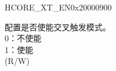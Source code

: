 \begin{register}{H}{CORE\_XT\_EN}{0x20000900}\label{regdesc:CTI_EN}
%
%
\regnewline%
\begin{regdesc}\begin{reglist}
\label{fielddesc:XT_EN}\item [XT\_EN] 配置是否使能交叉触发模式。\\
0：不使能\\
1：使能\\
(R/W)
\end{reglist}\end{regdesc}
\end{register}
